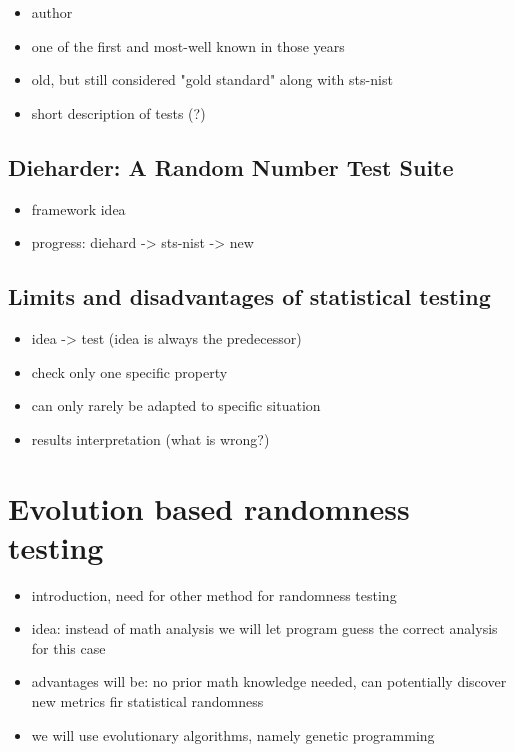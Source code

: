 \documentclass[12pt,oneside]{fithesis2}
\begin{document}
\begin{itemize}
\item author
\item one of the first and most-well known in those years
\item old, but still considered "gold standard" along with sts-nist
\item short description of tests (?)
\end{itemize}

\section{Dieharder: A Random Number Test Suite}
\label{sec:dieharder}

\begin{itemize}
\item framework idea
\item progress: diehard -> sts-nist -> new
\end{itemize}

\section{Limits and disadvantages of statistical testing}
\label{sec:limits-stat-testing}

\begin{itemize}
\item idea -> test (idea is always the predecessor)
\item check only one specific property
\item can only rarely be adapted to specific situation
\item results interpretation (what is wrong?)
\end{itemize}

\chapter{Evolution based randomness testing}
\label{chap:evo-based-testing}

\begin{itemize}
\item introduction, need for other method for randomness testing
\item idea: instead of math analysis we will let program guess the correct analysis for this case
\item advantages will be: no prior math knowledge needed, can potentially discover new metrics fir statistical randomness
\item we will use evolutionary algorithms, namely genetic programming
\end{itemize}
\end{document}
